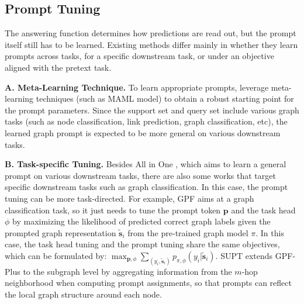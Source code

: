\subsection{Prompt Tuning}\label{subsec:pt}

\textit{}

The answering function determines how predictions are read out, but the prompt itself still has to be learned. Existing methods differ mainly in whether they learn prompts across tasks, for a specific downstream task, or under an objective aligned with the pretext task.

\textbf{A. Meta-Learning Technique. }
To learn appropriate prompts, \citet{sun2023all}  leverage meta-learning techniques (such as MAML\cite{finn2017modelagnostic} model) to obtain a robust starting point for the prompt parameters. Since the support set and query set include various graph tasks (such as node classification, link prediction, graph classification, etc), the learned graph prompt is expected to be more general on various downstream tasks.

\textbf{B. Task-specific Tuning. }
Besides All in One \cite{sun2023all}, which aims to learn a general prompt on various downstream tasks, there are also some works that target specific downstream tasks such as graph classification. In this case, the prompt tuning can be more task-directed. For example, GPF \cite{fang2022prompt} aims at a graph classification task, so it just needs to tune the prompt token $\textbf{p}$ and the task head $\phi$ by maximizing the likelihood of predicted correct graph labels given the prompted graph representation $\tilde{\textbf{s}}_i$ from the pre-trained graph model $\pi$. In this case, the task head tuning and the prompt tuning share the same objectives, which can be formulated by: $\max_{\textbf{p}, \phi} \sum_{(y_i,\tilde{\textbf{s}}_i)} p_{\pi, \phi} (y_i| \tilde{\textbf{s}}_i)$. SUPT \cite{lee2024supt} extends GPF-Plus to the subgraph level by aggregating information from the $m$-hop neighborhood when computing prompt assignments, so that prompts can reflect the local graph structure around each node.



